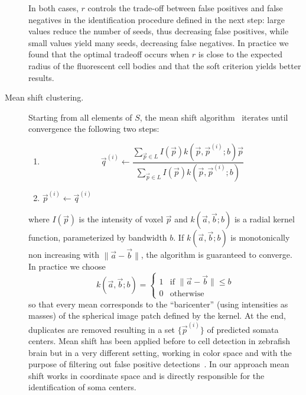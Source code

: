 \documentclass[smallextended]{svjour3}       %
\begin{document}
\begin{description}
  In both cases, $r$ controls the trade-off between false positives
  and false negatives in the identification procedure defined in the
  next step: large values reduce the number of seeds, thus decreasing
  false positives, while small values yield many seeds, decreasing
  false negatives. In practice we found that the optimal tradeoff
  occurs when $r$ is close to the expected radius of the fluorescent
  cell bodies and that the soft criterion yields better results.
\item[Mean shift clustering.] Starting from all elements of $S$, the
  mean shift algorithm~\cite{comaniciu_mean_2002} iterates until
  convergence the following two steps:
  \begin{enumerate}
  \item
    $$
    \vec{q}^{(i)} \leftarrow \frac{\sum_{\vec{p}\in L} I(\vec{p}) k(\vec{p},\vec{p}^{(i)};b) \vec{p}}{\sum_{\vec{p}\in L} I(\vec{p})k(\vec{p},\vec{p}^{(i)};b)}
    $$ %
  \item $\vec{p}^{(i)} \leftarrow \vec{q}^{(i)}$
  \end{enumerate}
  where $I(\vec{p})$ is the intensity of voxel $\vec{p}$ and
  $k(\vec{a},\vec{b};b)$ is a radial kernel function, parameterized by
  bandwidth $b$. If $k(\vec{a},\vec{b};b)$ is monotonically non
  increasing with $\|\vec{a}-\vec{b}\|$, the algorithm is guaranteed
  to converge. In practice we choose
  \begin{equation}
    \label{eq:kernel}
  k(\vec{a},\vec{b};b) = \left\{
    \begin{array}{ll}
      1 & \mbox{if $\|\vec{a}-\vec{b}\| \leq b$}\\
      0 & \mbox{otherwise}
    \end{array}
    \right.
  \end{equation}
  so that every mean corresponds to the ``baricenter'' (using
  intensities as masses) of the spherical image patch defined by the
  kernel.  At the end, duplicates are removed resulting in a set
  $\{\vec{p}^{(i)}\}$ of predicted somata centers.  Mean shift has
  been applied before to cell detection in zebrafish brain but in a
  very different setting, working in color space and with the purpose
  of filtering out false positive
  detections~\cite{liu_automated_2008}. In our approach mean shift
  works in coordinate space and is directly responsible for the
  identification of soma centers.
\end{description}
\end{document}
